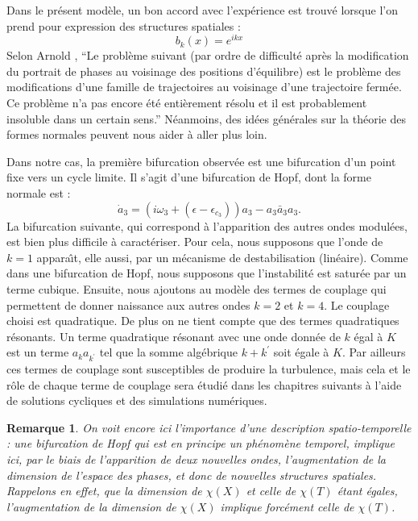 \documentclass{book}
\newtheorem{rem}{Remarque}[chapter]
\begin{document}
Dans le pr\'esent mod\`ele, un bon accord avec l'exp\'erience est
trouv\'e lorsque l'on prend pour expression des structures spatiales :
\begin{equation}
b_k(x)=e^{i k x}
\end{equation}
Selon Arnold \cite{Arnold80},
``Le probl\`eme suivant (par ordre de difficult\'e apr\`es la
modification du portrait de phases au voisinage des positions 
d'\'equilibre) est le probl\`eme des modifications d'une famille de 
trajectoires au voisinage d'une trajectoire ferm\'ee. Ce probl\`eme 
n'a pas encore \'et\'e enti\`erement  r\'esolu et il est probablement
insoluble dans un certain sens.''
N\'eanmoins, des id\'ees g\'en\'erales sur la th\'eorie des formes
normales 
peuvent nous aider \`a aller plus loin. 


Dans notre cas, la premi\`ere bifurcation observ\'ee est une
bifurcation d'un point 
fixe vers un cycle limite. Il s'agit d'une bifurcation de
Hopf, dont
la forme normale est :
\begin{equation}
\dot a_3=(i\omega_3+(\epsilon-\epsilon_{c_3}))a_3-a_3\bar a_3 a_3.
\end{equation}
La bifurcation suivante, qui correspond \`a l'apparition des autres ondes
modul\'ees, est bien plus difficile \`a caract\'eriser.
Pour cela, nous supposons que
l'onde de $k=1$ appara\^\i t, elle aussi, par un m\'ecanisme de
destabilisation (lin\'eaire). Comme dans une bifurcation de Hopf, nous
supposons que l'instabilit\'e est satur\'ee par un terme cubique.
Ensuite, nous ajoutons au mod\`ele des termes de couplage qui permettent
de donner naissance aux autres ondes $k=2$ et $k=4$. Le couplage
choisi est quadratique. De plus on ne tient compte que des termes
quadratiques r\'esonants. 
Un terme quadratique r\'esonant avec une onde
donn\'ee de $k$ \'egal \`a $K$ est un terme $a_ka_{k^\prime}$ tel
que la 
somme alg\'ebrique $k+{k^\prime}$ soit \'egale \`a $K$.
Par ailleurs ces termes de couplage sont susceptibles de produire la
turbulence, mais cela et 
le r\^ole de chaque terme de couplage sera
\'etudi\'e dans les chapitres suivants \`a l'aide de solutions
cycliques et 
des simulations num\'eriques.


\begin{rem}
On voit encore ici l'importance d'une description spatio-temporelle :
une bifurcation de Hopf qui est en principe un ph\'enom\`ene temporel,
implique ici, par le biais de l'apparition de deux nouvelles ondes, 
l'augmentation de la dimension de l'espace des phases, et donc de
nouvelles structures spatiales. Rappelons en effet, que la dimension de
$\chi(X)$ et celle de $\chi(T)$ \'etant \'egales, l'augmentation de la
dimension de $\chi(X)$ implique forc\'ement celle de
$\chi(T)$. 
\end{rem}
\end{document}
